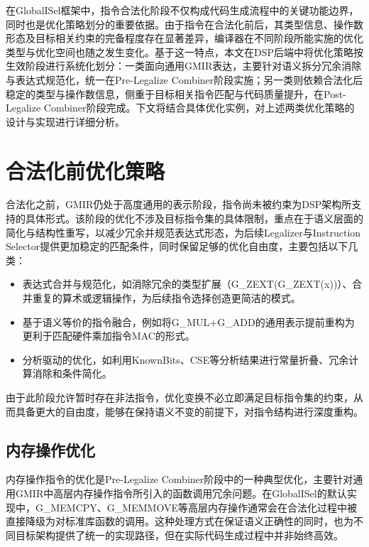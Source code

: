 在GlobalISel框架中，指令合法化阶段不仅构成代码生成流程中的关键功能边界，同时也是优化策略划分的重要依据。由于指令在合法化前后，其类型信息、操作数形态及目标相关约束的完备程度存在显著差异，编译器在不同阶段所能实施的优化类型与优化空间也随之发生变化。基于这一特点，本文在DSP后端中将优化策略按生效阶段进行系统化划分：一类面向通用GMIR表达，主要针对语义拆分冗余消除与表达式规范化，统一在Pre-Legalize Combiner阶段实施；另一类则依赖合法化后稳定的类型与操作数信息，侧重于目标相关指令匹配与代码质量提升，在Post-Legalize Combiner阶段完成。下文将结合具体优化实例，对上述两类优化策略的设计与实现进行详细分析。


\section{合法化前优化策略}
合法化之前，GMIR仍处于高度通用的表示阶段，指令尚未被约束为DSP架构所支持的具体形式。该阶段的优化不涉及目标指令集的具体限制，重点在于语义层面的简化与结构性重写，以减少冗余并规范表达式形态，为后续Legalizer与Instruction Selector提供更加稳定的匹配条件，同时保留足够的优化自由度，主要包括以下几类：

\begin{itemize}
	\item
	表达式合并与规范化，如消除冗余的类型扩展（G\_ZEXT(G\_ZEXT(x))）、合并重复的算术或逻辑操作，为后续指令选择创造更简洁的模式。
	
	\item
	基于语义等价的指令融合，例如将G\_MUL+G\_ADD的通用表示提前重构为更利于匹配硬件乘加指令MAC的形式。
	
	\item 
	分析驱动的优化，如利用KnownBits、CSE等分析结果进行常量折叠、冗余计算消除和条件简化。
	
\end{itemize}

由于此阶段允许暂时存在非法指令，优化变换不必立即满足目标指令集的约束，从而具备更大的自由度，能够在保持语义不变的前提下，对指令结构进行深度重构。


\subsection{内存操作优化}
内存操作指令的优化是Pre-Legalize Combiner阶段中的一种典型优化，主要针对通用GMIR中高层内存操作指令所引入的函数调用冗余问题。在GlobalISel的默认实现中，G\_MEMCPY、G\_MEMMOVE等高层内存操作通常会在合法化过程中被直接降级为对标准库函数的调用。这种处理方式在保证语义正确性的同时，也为不同目标架构提供了统一的实现路径，但在实际代码生成过程中并非始终高效。

